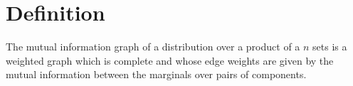 
\section*{Definition}

The mutual information graph of a distribution over a product of a $n$ sets is a weighted graph which is complete and whose edge weights are given by the mutual information between the marginals over pairs of components.

\blankpage